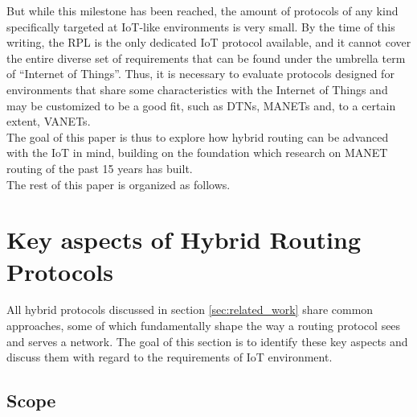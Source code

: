 \documentclass[a4paper,10pt]{scrartcl}
\begin{document}
But while this milestone has been reached, the amount of protocols of any kind specifically targeted at IoT-like environments is very small. By the time of this writing, the \gls{RPL} is the only dedicated IoT protocol available, and it cannot cover the entire diverse set of requirements that can be found under the umbrella term of ``Internet of Things''. Thus, it is necessary to evaluate protocols designed for environments that share some characteristics with the Internet of Things and may be customized to be a good fit, such as \glspl{DTN}, \glspl{MANET} and, to a certain extent, \glspl{VANET}.\\

The goal of this paper is thus to explore how hybrid routing can be advanced with the \gls{IoT} in mind, building on the foundation which research on \gls{MANET} routing of the past 15 years has built.\\ 
The rest of this paper is organized as follows. 

\section{Key aspects of Hybrid Routing Protocols}
\label{sec:key_aspects}
All hybrid protocols discussed in section \ref{sec:related_work} share common approaches, some of which fundamentally shape the way a routing protocol sees and serves a network. The goal of this section is to identify these key aspects and discuss them with regard to the requirements of IoT environment.

\subsection{Scope}
\label{subsec:scope}
\end{document}
